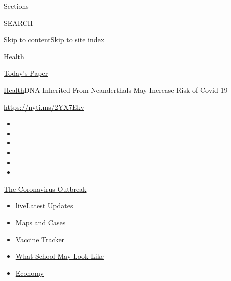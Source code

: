 Sections

SEARCH

\protect\hyperlink{site-content}{Skip to
content}\protect\hyperlink{site-index}{Skip to site index}

\href{https://www.nytimes.com/section/health}{Health}

\href{https://myaccount.nytimes.com/auth/login?response_type=cookie\&client_id=vi}{}

\href{https://www.nytimes.com/section/todayspaper}{Today's Paper}

\href{/section/health}{Health}\textbar{}DNA Inherited From Neanderthals
May Increase Risk of Covid-19

\url{https://nyti.ms/2YX7Ekv}

\begin{itemize}
\item
\item
\item
\item
\item
\item
\end{itemize}

\href{https://www.nytimes.com/news-event/coronavirus?action=click\&pgtype=Article\&state=default\&region=TOP_BANNER\&context=storylines_menu}{The
Coronavirus Outbreak}

\begin{itemize}
\tightlist
\item
  live\href{https://www.nytimes.com/2020/08/01/world/coronavirus-covid-19.html?action=click\&pgtype=Article\&state=default\&region=TOP_BANNER\&context=storylines_menu}{Latest
  Updates}
\item
  \href{https://www.nytimes.com/interactive/2020/us/coronavirus-us-cases.html?action=click\&pgtype=Article\&state=default\&region=TOP_BANNER\&context=storylines_menu}{Maps
  and Cases}
\item
  \href{https://www.nytimes.com/interactive/2020/science/coronavirus-vaccine-tracker.html?action=click\&pgtype=Article\&state=default\&region=TOP_BANNER\&context=storylines_menu}{Vaccine
  Tracker}
\item
  \href{https://www.nytimes.com/interactive/2020/07/29/us/schools-reopening-coronavirus.html?action=click\&pgtype=Article\&state=default\&region=TOP_BANNER\&context=storylines_menu}{What
  School May Look Like}
\item
  \href{https://www.nytimes.com/live/2020/07/31/business/stock-market-today-coronavirus?action=click\&pgtype=Article\&state=default\&region=TOP_BANNER\&context=storylines_menu}{Economy}
\end{itemize}

